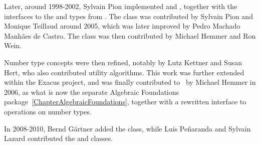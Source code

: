 Later, around 1998-2002, Sylvain Pion implemented 
 and , together with the interfaces to
the  and  types from \gmp.  The 
class was contributed by Sylvain Pion and Monique Teillaud around 2005,
which was later improved by Pedro Machado Manh\~aes de Castro.
The class  was then contributed by Michael Hemmer and Ron Wein.

Number type concepts were then refined, notably by Lutz Kettner and
Susan Hert, who also contributed utility algorithms.
This work was further extended within the Exacus project, and was finally
contributed to \cgal\ by Michael Hemmer in 2006, as what is now the separate
Algebraic Foundations package~\ref{ChapterAlgebraicFoundations}, together with
a rewritten interface to operations on number types.

In 2008-2010, Bernd G\"artner added the  class, while Luis
Pe\~naranda and Sylvain Lazard contributed the  and 
classes.



%
%


% 
